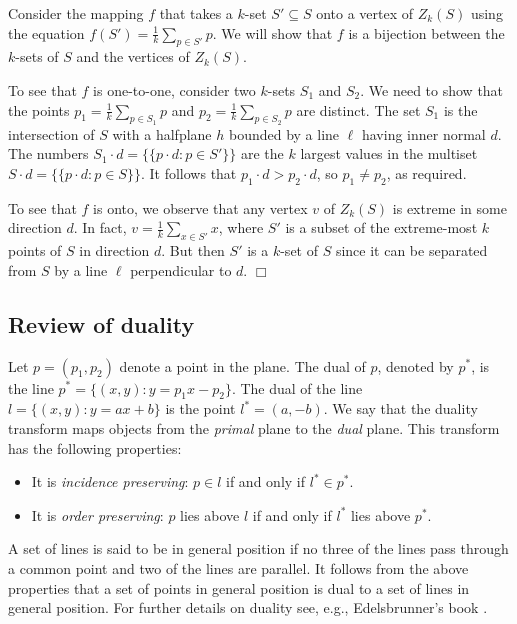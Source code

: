 \documentclass{elsart}
\newenvironment{proof}{{\bf Proof:} \rm}{\hfill $\Box$ \medskip\\}
\begin{document}
\begin{proof}
Consider the mapping $f$ that takes a $k$-set $S'\subseteq S$ onto a
vertex of $Z_k(S)$ using the equation $f(S')=\frac{1}{k}\sum_{p\in S'}
p$.  We will show that $f$ is a bijection between the $k$-sets of $S$ and
the vertices of $Z_k(S)$.

To see that $f$ is one-to-one, consider two $k$-sets $S_1$ and $S_2$.
We need to show that the points $p_1=\frac{1}{k}\sum_{p\in S_1}p$ and
$p_2=\frac{1}{k}\sum_{p\in S_2}p$ are distinct.  The set $S_1$ is the
intersection of $S$ with a halfplane $h$ bounded by a line $\ell$
having inner normal $d$.  The numbers $S_1\cdot d=\{\!\{p\cdot d:p\in
S'\}\!\}$ are the $k$ largest values in the multiset $S\cdot d=\{\!\{p\cdot
d:p\in S\}\!\}$.  It follows
that $p_1\cdot d
> p_2\cdot d$, so $p_1\neq p_2$, as required.

To see that $f$ is onto, we observe that any vertex $v$ of $Z_k(S)$ is
extreme in some direction $d$.  In fact, $v=\frac{1}{k}\sum_{x\in S'}
x$, where $S'$ is a subset of the extreme-most $k$ points of $S$ in
direction $d$.  But then $S'$ is a $k$-set of $S$ since it can be
separated from $S$ by a line $\ell$ perpendicular to $d$.
\end{proof}



\subsection{Review of duality}\label{subsection_review_of_duality}

Let $p = (p_1, p_2)$ denote a point in the plane. The dual of $p$,
denoted by $p^*$, is the line $p^* = \{(x,y) : y = p_1x -
p_2\}$. The dual of the line $l = \{(x,y) : y = ax + b\}$ is the point
$l^* = (a,-b)$.  
We say that the duality transform maps objects from the \emph{primal}
plane to the \emph{dual} plane. This transform has the following
properties:

\begin{itemize}
\item It is \emph{incidence preserving}: $p \in l$ if and only if $l^*
\in p^*$.

\item It is \emph{order preserving}: $p$ lies above $l$ if and only if $l^*$ lies above $p^*$.
\end{itemize}

A set of lines is said to be in general position if no three of the
lines pass through a common point and two of the lines are parallel.
It follows from the above properties that a set of points in general
position is dual to a set of lines in general position. For further
details on duality see, e.g., Edelsbrunner's book
\cite{edelsbrunner_book}.
\end{document}
